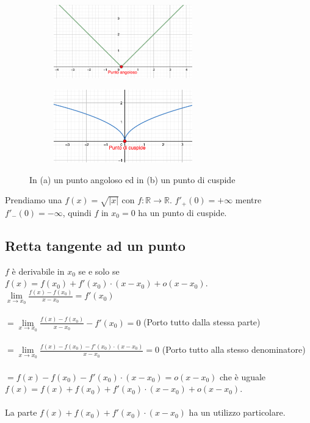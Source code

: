\begin{figure}[h!]
    \centering
    \begin{subfigure}{.4\textwidth}
        \centering
        \includegraphics[width=6cm]{images/punto-angoloso.png}
        \caption{}
    \end{subfigure}
    \hspace{2cm}
    \begin{subfigure}{.4\textwidth}
        \centering
        \includegraphics[width=6cm]{images/punto-cuspide.png}
        \caption{}
    \end{subfigure}
    \caption{In (a) un punto angoloso ed in (b) un punto di cuspide}
\end{figure}

\begin{example}
Prendiamo una $f(x) = \sqrt{|x|}$ con $f: \mathbb{R} \to \mathbb{R}$.
$f'_+(0) = +\infty$ mentre $f'_-(0) = -\infty$, quindi $f$ in $x_0 = 0$ ha un punto di cuspide.
\end{example}

\subsection{Retta tangente ad un punto}
\begin{observation}
$f$ è derivabile in $x_0$ se e solo se $f(x) = f(x_0) + f'(x_0) \cdot (x - x_0) + o(x - x_0)$.
$\lim\limits_{x\to x_0}\frac{f(x) - f(x_0)}{x - x_0} = f'(x_0)$ \\\\
$=\lim\limits_{x\to x_0}\frac{f(x) - f(x_0)}{x - x_0} - f'(x_0) = 0$ (Porto tutto dalla stessa parte)\\\\
$=\lim\limits_{x\to x_0}\frac{f(x) - f(x_0) - f'(x_0) \cdot (x - x_0)}{x - x_0} = 0$ (Porto tutto alla stesso denominatore)\\\\
$= f(x) - f(x_0) - f'(x_0) \cdot (x - x_0) = o (x - x_0)$ che è uguale $f(x) = f(x) + f(x_0) + f'(x_0) \cdot (x - x_0) + o (x - x_0)$.\\\\
La parte $f(x) + f(x_0) + f'(x_0) \cdot (x - x_0)$ ha un utilizzo particolare.
\end{observation}

